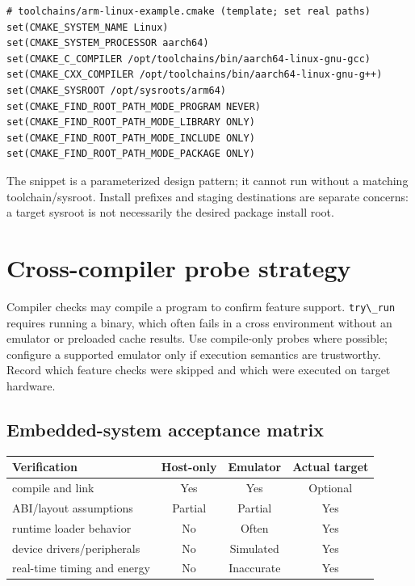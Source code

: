 \documentclass[11pt,letterpaper,oneside]{report}
\providecommand{\passthrough}[1]{#1}
\begin{document}
\begin{lstlisting}
# toolchains/arm-linux-example.cmake (template; set real paths)
set(CMAKE_SYSTEM_NAME Linux)
set(CMAKE_SYSTEM_PROCESSOR aarch64)
set(CMAKE_C_COMPILER /opt/toolchains/bin/aarch64-linux-gnu-gcc)
set(CMAKE_CXX_COMPILER /opt/toolchains/bin/aarch64-linux-gnu-g++)
set(CMAKE_SYSROOT /opt/sysroots/arm64)
set(CMAKE_FIND_ROOT_PATH_MODE_PROGRAM NEVER)
set(CMAKE_FIND_ROOT_PATH_MODE_LIBRARY ONLY)
set(CMAKE_FIND_ROOT_PATH_MODE_INCLUDE ONLY)
set(CMAKE_FIND_ROOT_PATH_MODE_PACKAGE ONLY)
\end{lstlisting}

The snippet is a parameterized design pattern; it cannot run without a
matching toolchain/sysroot. Install prefixes and staging destinations
are separate concerns: a target sysroot is not necessarily the desired
package install root.

\chapter{Cross-compiler probe
strategy}\label{cross-compiler-probe-strategy}

Compiler checks may compile a program to confirm feature support.
\passthrough{\lstinline!try\_run!} requires running a binary, which
often fails in a cross environment without an emulator or preloaded
cache results. Use compile-only probes where possible; configure a
supported emulator only if execution semantics are trustworthy. Record
which feature checks were skipped and which were executed on target
hardware.

\section{Embedded-system acceptance
matrix}\label{embedded-system-acceptance-matrix}

\begin{longtable}[]{@{}lccc@{}}
\toprule\noalign{}
Verification & Host-only & Emulator & Actual target \\
\midrule\noalign{}
\endhead
\bottomrule\noalign{}
\endlastfoot
compile and link & Yes & Yes & Optional \\
ABI/layout assumptions & Partial & Partial & Yes \\
runtime loader behavior & No & Often & Yes \\
device drivers/peripherals & No & Simulated & Yes \\
real-time timing and energy & No & Inaccurate & Yes \\
\end{longtable}
\end{document}
